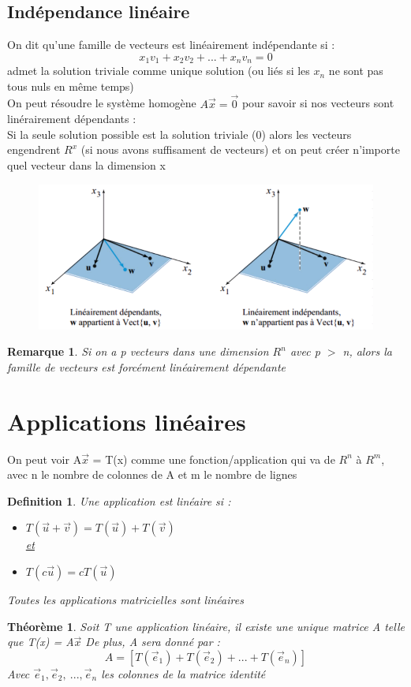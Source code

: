 \documentclass{article}
\newtheorem{definition}{Definition}[section]
\newtheorem{remark}{Remarque}[section]
\newtheorem{theorem}{Théorème}[section]
\begin{document}
\subsection{Indépendance linéaire}
On dit qu'une famille de vecteurs est linéairement indépendante si :
\[ x_1v_1 + x_2v_2 + ... + x_nv_n = 0\]
admet la solution triviale comme unique solution (ou liés si les \(x_n\) ne sont pas tous nuls en même temps)\\
On peut résoudre le système homogène \( A\overrightarrow{x} = \overrightarrow{0}\) pour savoir si nos vecteurs sont linérairement dépendants : \\
Si la seule solution possible est la solution triviale (0) alors les vecteurs engendrent \(R^x\) (si nous avons suffisament de vecteurs) et on peut créer n'importe quel vecteur dans la dimension x
\begin{figure}[htp]
    \centering
    \includegraphics[width=12cm]{Images/linéarité.png}
    \label{fig:linearite}
\end{figure}
\begin{remark}
    Si on a p vecteurs dans une dimension \(R^n\) avec p \(>\) n, alors la famille de vecteurs est forcément linéairement dépendante 
\end{remark}
\section{Applications linéaires}
On peut voir A\(\overrightarrow{x}\) = T(x) comme une fonction/application qui va de \(R^n\) à \(R^m\), avec n le nombre de colonnes de A et m le nombre de lignes
\begin{definition}
    Une application est linéaire si :
    \begin{itemize}
        \item \(T(\overrightarrow{u} + \overrightarrow{v}) = T(\overrightarrow{u}) + T(\overrightarrow{v})\) \\
        \underline{et}
        \item \(T(c\overrightarrow{u}) = cT(\overrightarrow{u}) \)
    \end{itemize}
    Toutes les applications matricielles sont linéaires
\end{definition}
\begin{theorem}
    Soit T une application linéaire, il existe une unique matrice A telle que T(x) = A\(\overrightarrow{x}\)
    De plus, A sera donné par : 
    \[ A = [ T(\overrightarrow{e}_1) + T(\overrightarrow{e}_2) + ... + T(\overrightarrow{e}_n)] \]
    Avec \( \overrightarrow{e}_1, \overrightarrow{e}_2,\ ..., \overrightarrow{e}_n \) les colonnes de la matrice identité
\end{theorem}
\end{document}
